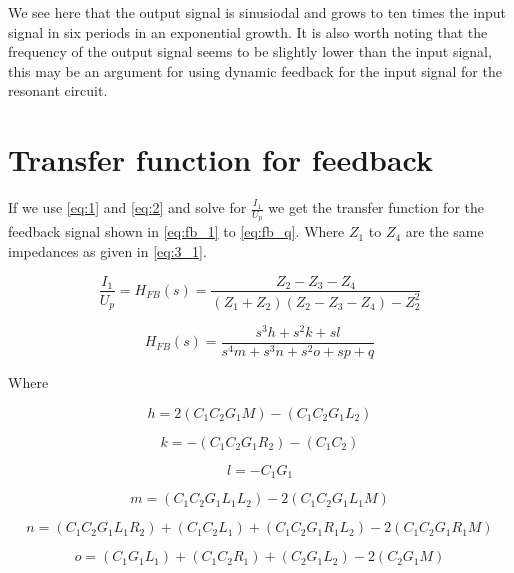 We see here that the output signal is sinusiodal and grows to ten times the input signal in six periods in an exponential growth. It is also worth noting that the frequency of the output signal seems to be slightly lower than the input signal, this may be an argument for using dynamic feedback for the input signal for the resonant circuit.

\newpage
\section{Transfer function for feedback}
If we use \cref{eq:1} and \cref{eq:2} and solve for $\frac{I_1}{U_p}$ we get the transfer function for the feedback signal shown in \cref{eq:fb_1} to \cref{eq:fb_q}. Where $Z_1$ to $Z_4$ are the same impedances as given in \cref{eq:3_1}.

\begin{equation} \label{eq:fb_1}
\frac{I_1}{U_p} = H_{FB}(s) = \frac{Z_2-Z_3-Z_4}{(Z_1+Z_2)(Z_2-Z_3-Z_4)-Z_2^2}
\end{equation}

\begin{equation} \label{eq:fb_2}
    H_{FB}(s) = \frac{s^3 h + s^2 k + s l}{s^4 m + s^3 n + s^2 o + s p + q}
\end{equation}

Where

\begin{equation}
    h = 2(C_1 C_2 G_1 M) - (C_1 C_2 G_1 L_2)
\end{equation}

\begin{equation}
    k = -(C_1 C_2 G_1 R_2) - (C_1 C_2)
\end{equation}

\begin{equation}
    l = -C_1 G_1
\end{equation}

\begin{equation}
    m = (C_1 C_2 G_1 L_1 L_2)-2(C_1 C_2 G_1 L_1 M)
\end{equation}

\begin{equation} \label{eq:}
    n = (C_1 C_2 G_1 L_1 R_2) + (C_1 C_2 L_1) + (C_1 C_2 G_1 R_1 L_2) - 2(C_1 C_2 G_1 R_1 M)
\end{equation}

\begin{equation} \label{eq:}
    o = (C_1 G_1 L_1) + (C_1 C_2 R_1) + (C_2 G_1 L_2) -2(C_2 G_1 M)
\end{equation}

